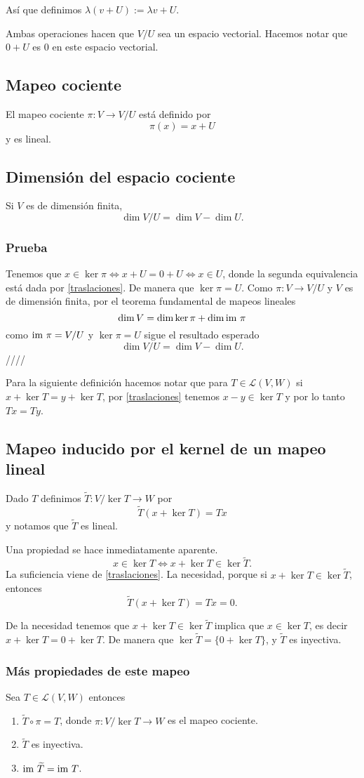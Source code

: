 \documentclass{article}
\begin{document}
Así que definimos $\lambda (v + U):= \lambda v + U$.

Ambas operaciones hacen que $V/U$ sea un espacio vectorial.
Hacemos notar que $0+U$ es $0$ en este espacio vectorial.

\subsection{Mapeo cociente}
El mapeo cociente $\pi: V \rightarrow V/U$ está definido por
$$\pi(x)=x+U$$
y es lineal.

\subsection{Dimensión del espacio cociente}
Si $V$ es de dimensión finita,
$$\dim V/U = \dim V - \dim U.$$
\subsubsection*{Prueba}
Tenemos que $x\in\ker \pi \iff x+U = 0+U \iff x\in U$, donde la
segunda equivalencia está dada por \ref{traslaciones}. De
manera que $\ker\pi = U$. Como $\pi: V \rightarrow V/U$ y $V$ es de 
dimensión finita, por el teorema fundamental de mapeos lineales
$$\dim V = \dim\ker\pi + \dim\text{im }\pi$$
como $\text{im }\pi=V/U$ y $\ker\pi = U$ sigue el resultado esperado
$$\dim V/U = \dim V - \dim U.$$
\hfill ////

Para la siguiente definición hacemos notar que para
$T\in\mathcal{L}(V,W)$ si $x+\ker T = y+\ker T$, por \ref{traslaciones}
tenemos $x-y\in\ker T$ y por lo tanto $Tx=Ty$.
\subsection{Mapeo inducido por el kernel de un mapeo lineal}
Dado $T$ definimos $\widetilde T: V/\ker T\rightarrow W$ por
$$\widetilde T(x+\ker T) = Tx$$
y notamos que $\widetilde T$ es lineal.

Una propiedad se hace inmediatamente aparente.
$$x\in\ker T \iff x+\ker T\in \ker\widetilde{T}.$$
La suficiencia viene de \ref{traslaciones}.
La necesidad, porque si $x+\ker T\in \ker\widetilde{T}$, entonces
$$\widetilde T(x+\ker T) = Tx = 0.$$

De la necesidad tenemos que $x+\ker T\in \ker\widetilde{T}$
implica que $x\in\ker T$, es decir $x +\ker T = 0+\ker T$. De manera
que $\ker\widetilde{T} = \{0+\ker T\}$, y $\widetilde{T}$ es inyectiva.

\subsubsection{Más propiedades de este mapeo}
Sea $T\in\mathcal{L}(V,W)$ entonces
\begin{enumerate}
    \item $\widetilde{T}\circ\pi = T$, donde
    $\pi:V/\ker T\rightarrow W$ es el mapeo cociente.
    \item $\widetilde{T}$ es inyectiva.
    \item $\text{im } \widetilde{T} = \text{im } T$.
\end{enumerate}
\end{document}
